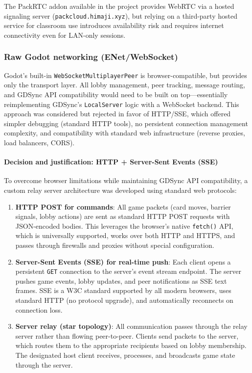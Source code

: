 The PackRTC addon available in the project provides WebRTC via a hosted signaling server (\texttt{packcloud.himaji.xyz}), but relying on a third-party hosted service for classroom use introduces availability risk and requires internet connectivity even for LAN-only sessions.

\subsubsection*{Raw Godot networking (ENet/WebSocket)}

Godot's built-in \texttt{WebSocketMultiplayerPeer} is browser-compatible, but provides only the transport layer. All lobby management, peer tracking, message routing, and GDSync API compatibility would need to be built on top---essentially reimplementing GDSync's \texttt{LocalServer} logic with a WebSocket backend. This approach was considered but rejected in favor of HTTP/SSE, which offered simpler debugging (standard HTTP tools), no persistent connection management complexity, and compatibility with standard web infrastructure (reverse proxies, load balancers, CORS).

\paragraph*{Decision and justification: HTTP + Server-Sent Events (SSE)}

To overcome browser limitations while maintaining GDSync API compatibility, a custom relay server architecture was developed using standard web protocols:

\begin{enumerate}
    \item \textbf{HTTP POST for commands}: All game packets (card moves, barrier signals, lobby actions) are sent as standard HTTP POST requests with JSON-encoded bodies. This leverages the browser's native \texttt{fetch()} API, which is universally supported, works over both HTTP and HTTPS, and passes through firewalls and proxies without special configuration.
    \item \textbf{Server-Sent Events (SSE) for real-time push}: Each client opens a persistent \texttt{GET} connection to the server's event stream endpoint. The server pushes game events, lobby updates, and peer notifications as SSE text frames. SSE is a W3C standard supported by all modern browsers, uses standard HTTP (no protocol upgrade), and automatically reconnects on connection loss.
    \item \textbf{Server relay (star topology)}: All communication passes through the relay server rather than flowing peer-to-peer. Clients send packets to the server, which routes them to the appropriate recipients based on lobby membership. The designated host client receives, processes, and broadcasts game state through the server.
\end{enumerate}

